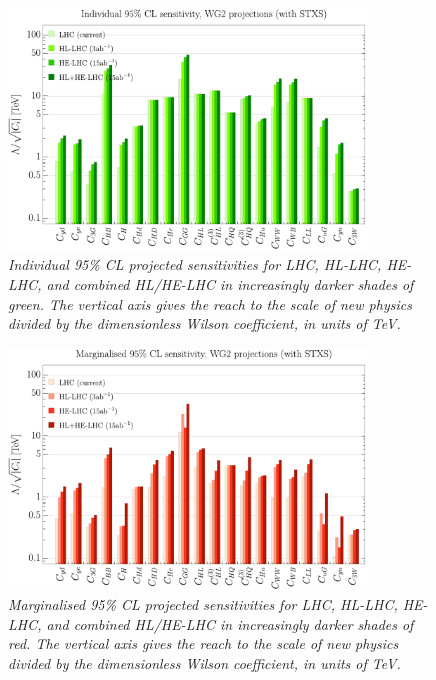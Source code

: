\documentclass[../report.tex]{subfiles}
\begin{document}
\begin{figure}
  \centering
 \includegraphics[width=0.85\textwidth]{section8/plots/individualbarchart.pdf}
 \caption{\it Individual 95\% CL projected sensitivities for LHC, HL-LHC, HE-LHC, and combined HL/HE-LHC in increasingly darker shades of green. The vertical axis gives the reach to the scale of new physics divided by the dimensionless Wilson coefficient, in units of TeV. }
   \label{fig:indiv}
\end{figure} 

\begin{figure}
  \centering
 \includegraphics[width=0.85\textwidth]{section8/plots/marginalisedbarchart.pdf}
 \caption{\it  Marginalised 95\% CL projected sensitivities for LHC, HL-LHC, HE-LHC, and combined HL/HE-LHC in increasingly darker shades of red. The vertical axis gives the reach to the scale of new physics divided by the dimensionless Wilson coefficient, in units of TeV.}
   \label{fig:marg}
\end{figure} 
\end{document}
